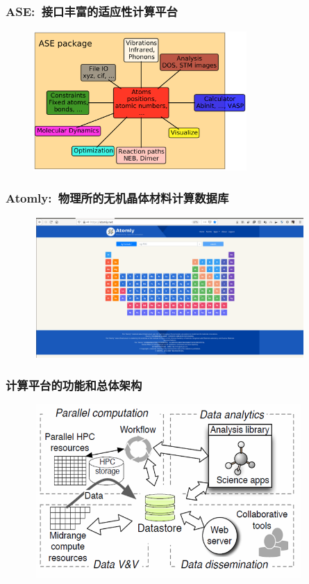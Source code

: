 \documentclass[cjk,slidestop,compress,mathserif,blue]{beamer}
\begin{document}
\frame
{
	\frametitle{\textrm{ASE}:~接口丰富的适应性计算平台}
\begin{figure}[h!]
\centering
\vspace*{-0.2in}
\includegraphics[height=2.1in,width=3.2in,viewport=0 0 1208 830,clip]{Figures/ASE_Python_lib.png}
\caption{\fontsize{7.2pt}{4.2pt}}%
\label{Logo_ASE_lib}
\end{figure} 
}

\frame
{
	\frametitle{\textrm{Atomly}:~物理所的无机晶体材料计算数据库}
\begin{figure}[h!]
\centering
\vspace*{-0.2in}
\includegraphics[height=2.1in,width=4.1in,viewport=5 0 1608 830,clip]{Figures/Atomly.png}
\caption{\fontsize{7.2pt}{4.2pt}}%
\label{Logo_Atomly_lib}
\end{figure} 
}

\frame
{
	\frametitle{\textrm{计算平台的功能和总体架构}}
\begin{figure}[h!]
\centering
\vspace*{-0.35in}
\includegraphics[height=2.6in,width=4.05in,viewport=0 0 670 460,clip]{Figures/Parallel_computation.png}
\caption{\fontsize{7.2pt}{4.2pt}}%
\label{Auto_Flow}
\end{figure} 
}
\end{document}
